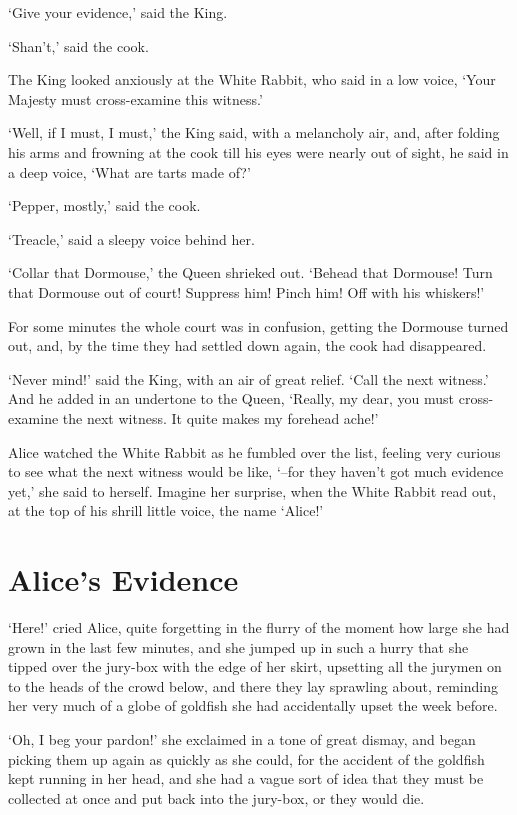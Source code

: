 \documentclass[statementpaper,twoside,openany]{memoir}
\begin{document}
`Give your evidence,' said the King.

`Shan't,' said the cook.

The King looked anxiously at the White Rabbit, who said in a low voice, `Your Majesty must cross-examine this witness.'

`Well, if I must, I must,' the King said, with a melancholy air, and, after folding his arms and frowning at the cook till his eyes were nearly out of sight, he said in a deep voice, `What are tarts made of?'

`Pepper, mostly,' said the cook.

`Treacle,' said a sleepy voice behind her.

`Collar that Dormouse,' the Queen shrieked out. `Behead that Dormouse! Turn that Dormouse out of court! Suppress him! Pinch him! Off with his whiskers!'

For some minutes the whole court was in confusion, getting the Dormouse turned out, and, by the time they had settled down again, the cook had disappeared.

`Never mind!' said the King, with an air of great relief. `Call the next witness.' And he added in an undertone to the Queen, `Really, my dear, you must cross-examine the next witness. It quite makes my forehead ache!'

Alice watched the White Rabbit as he fumbled over the list, feeling very curious to see what the next witness would be like, `--for they haven't got much evidence yet,' she said to herself. Imagine her surprise, when the White Rabbit read out, at the top of his shrill little voice, the name `Alice!'

\chapter{Alice's Evidence}

`Here!' cried Alice, quite forgetting in the flurry of the moment how large she had grown in the last few minutes, and she jumped up in such a hurry that she tipped over the jury-box with the edge of her skirt, upsetting all the jurymen on to the heads of the crowd below, and there they lay sprawling about, reminding her very much of a globe of goldfish she had accidentally upset the week before.

`Oh, I beg your pardon!' she exclaimed in a tone of great dismay, and began picking them up again as quickly as she could, for the accident of the goldfish kept running in her head, and she had a vague sort of idea that they must be collected at once and put back into the jury-box, or they would die.
\end{document}
